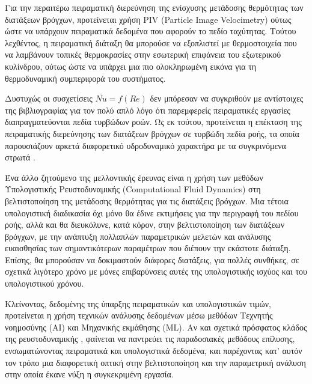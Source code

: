 Για την περαιτέρω πειραματική διερεύνηση της ενίσχυσης μετάδοσης θερμότητας των διατάξεων βρόγχων, προτείνεται χρήση PIV (Particle Image Velocimetry) ούτως ώστε να υπάρχουν πειραματικά δεδομένα που αφορούν το πεδίο ταχύτητας. Τούτου λεχθέντος, η πειραματική διάταξη θα μπορούσε να εξοπλιστεί με θερμοστοιχεία που να λαμβάνουν τοπικές θερμοκρασίες στην εσωτερική επιφάνεια του εξωτερικού κυλίνδρου, ούτως ώστε να υπάρχει μια πιο ολοκληρωμένη εικόνα για τη θερμοδυναμική συμπεριφορά του συστήματος.

Δυστυχώς οι συσχετίσεις $\overline{Nu} = f(Re)$ δεν μπόρεσαν να συγκριθούν με αντίστοιχες της βιβλιογραφίας για τον πολύ απλό λόγο ότι παρεμφερείς πειραματικές εργασίες διαπραγματεύονται πεδία τυρβώδων ροών. Ως εκ τούτου, προτείνεται η επέκταση της πειραματικής διερεύνησης των διατάξεων βρόγχων σε τυρβώδη πεδία ροής, τα οποία παρουσιάζουν αρκετά διαφορετικό υδροδυναμικό χαρακτήρα με τα συγκρινόμενα στρωτά \parencites{2016_Chen}{2016_Chena}{2018_Chen}.

Ένα άλλο ζητούμενο της μελλοντικής έρευνας είναι η χρήση των μεθόδων Υπολογιστικής Ρευστοδυναμικής (Computational Fluid Dynamics) στη βελτιστοποίηση της μετάδοσης θερμότητας για τις διατάξεις βρόγχων. Μια τέτοια υπολογιστική διαδικασία όχι μόνο θα έδινε εκτιμήσεις για την περιγραφή του πεδίου ροής, αλλά και θα διευκόλυνε, κατά κόρον, στην βελτιστοποίηση των διατάξεων βρόγχων, με την ανάπτυξη πολλαπλών παραμετρικών μελετών και ανάλυσης ευαισθησίας των σημαντικότερων παραμέτρων που διέπουν την εκάστοτε διάταξη. Επίσης, θα μπορούσαν να δοκιμαστούν διάφορες διατάξεις, για πολλές συνθήκες, σε σχετικά λιγότερο χρόνο με μόνες επιβαρύνσεις αυτές της υπολογιστικής ισχύος και του υπολογιστικού χρόνου.

Κλείνοντας, δεδομένης της ύπαρξης πειραματικών και υπολογιστικών τιμών, προτείνεται η χρήση τεχνικών ανάλυσης δεδομένων μέσω μεθόδων Τεχνητής νοημοσύνης (AI) και Μηχανικής εκμάθησης (ML). Αν και σχετικά πρόσφατος κλάδος της ρευστοδυναμικής \parencites{2022_Zhang}{2022_Brunton}, φαίνεται να παντρεύει τις παραδοσιακές μεθόδους επίλυσης, ενσωματώνοντας πειραματικά και υπολογιστικά δεδομένα, και παρέχοντας κατ' αυτόν τον τρόπο μια διαφορετική οπτική στην βελτιστοποίηση και την παραμετρική ανάλυση στην οποία έκανε νύξη η συγκεκριμένη εργασία.